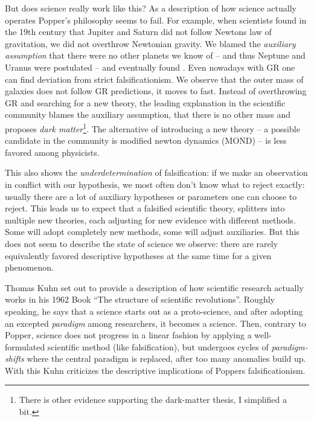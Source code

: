 But does science really work like this?
As a description of how science actually operates Popper's
philosophy seems to fail.
For example, when scientists found in the 19th century that Jupiter and Saturn
did not follow Newtons law of gravitation, we did not overthrow Newtonian gravity.
We blamed the \emph{auxiliary assumption} that there were no other planets we know of --
and thus Neptune and Uranus were postulated -- and eventually found \cite[193]{philsciencebook}.
Even nowadays with GR one can find deviation from
strict falsificationism.
We observe that the outer mass of galaxies does not
follow GR predictions, it moves to fast.
Instead of overthrowing GR and searching for a new theory,
the leading explanation in the scientific community
blames the auxiliary assumption, that there is no other mass and
proposes
\emph{dark matter}\footnote{There is other evidence supporting the dark-matter thesis, I simplified a bit.}.
The alternative of introducing a new theory
-- a possible candidate in the community is modified newton dynamics (MOND) --
is less favored among physicists.

This also shows the \emph{underdetermination} of falsification:
if we make an observation in conflict with our hypothesis, we most often don't
know what to reject exactly: usually there are a lot of auxiliary hypotheses
or parameters one can choose to reject.
This leads us to expect that a falsified scientific theory,
splitters into multiple new theories, each adjusting for new evidence with
different methods. Some will adopt completely new methods, some will
adjust auxiliaries.
But this does not seem to describe the state of science we observe:
there are rarely equivalently favored descriptive hypotheses at the same time
for a given phenomenon.

Thomas Kuhn set out to provide a description of how scientific
research actually works in his 1962 Book \enquote{The structure of scientific revolutions}.
Roughly speaking, he says that a science starts out as a proto-science, and
after adopting an excepted \emph{paradigm} among researchers,
it becomes a science.
Then, contrary to Popper, science does not progress in a linear
fashion by applying a well-formulated scientific method (like falsification),
but undergoes cycles of \emph{paradigm-shifts} where the central paradigm
is replaced, after too many anomalies build up.
With this Kuhn criticizes the descriptive implications
of Poppers falsificationism.

